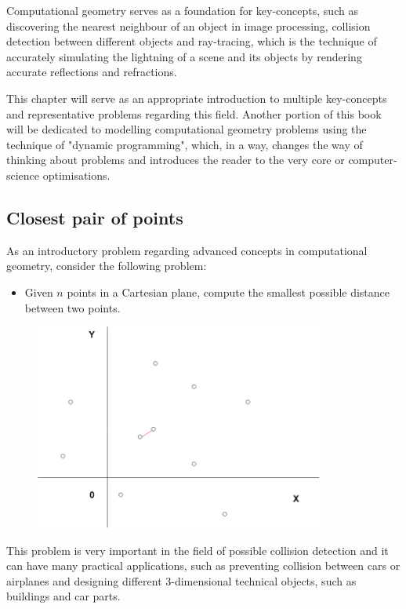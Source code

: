\documentclass[letterpaper]{article}
\begin{document}
Computational geometry serves as a foundation for key-concepts, such as discovering the nearest neighbour of an object in image processing, collision detection between different objects and ray-tracing, which is the technique of accurately simulating the lightning of a scene and its objects by rendering accurate reflections and refractions.

This chapter will serve as an appropriate introduction to multiple key-concepts and representative problems regarding this field. Another portion of this book will be dedicated to modelling computational geometry problems using the technique of "dynamic programming", which, in a way, changes the way of thinking about problems and introduces the reader to the very core or computer-science optimisations.

\newpage

\subsection{Closest pair of points}

As an introductory problem regarding advanced concepts in computational geometry, consider the following problem:

\begin{itemize}
    \item Given $n$ points in a Cartesian plane, compute the smallest possible distance between two points.
\end{itemize}

\begin{figure} [h!]
\centering
\includegraphics[width=0.85\textwidth]{pngOfDiagrams/closestpair1.png}
\end{figure}

This problem is very important in the field of possible collision detection and it can have many practical applications, such as preventing collision between cars or airplanes and designing different 3-dimensional technical objects, such as buildings and car parts.
\end{document}
